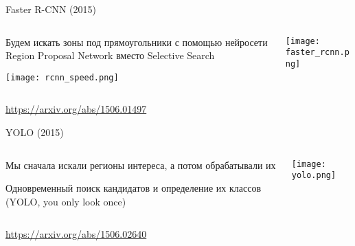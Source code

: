 \documentclass[notes,12pt, aspectratio=169]{beamer}
\newenvironment{wideitemize}{\itemize\addtolength{\itemsep}{10pt}}{\enditemize}
\begin{document}
\begin{frame}{Faster R-CNN (2015)}
	\begin{columns}[T] %
		\begin{column}{.49\textwidth}
			\begin{wideitemize}	
				\item Будем искать зоны под прямоугольники с помощью нейросети Region Proposal Network вместо Selective Search
			\end{wideitemize}
		\vspace{2mm}
		\begin{center}
			\texttt{[image: rcnn\_speed.png]}
		\end{center}
		\end{column}%
		\hfill%
		\begin{column}{.49\textwidth}
			\begin{center}
				\texttt{[image: faster\_rcnn.png]}
			\end{center}
		\end{column}%
	\end{columns}
	\vfill
\footnotesize
{\color{blue} \url{https://arxiv.org/abs/1506.01497}} 
\end{frame}


\begin{frame}{ YOLO (2015)}
	\begin{columns}[T] %
	\begin{column}{.35\textwidth}
		\begin{wideitemize}	
			\item Мы сначала искали регионы интереса, а потом обрабатывали их
			\item Одновременный поиск кандидатов и определение их классов (YOLO, you only look once)
		\end{wideitemize}
	\end{column}%
	\hfill%
	\begin{column}{.65\textwidth}
		\begin{center}
			\texttt{[image: yolo.png]}
		\end{center} 
	\end{column}%
\end{columns}
	
	\vfill
	\footnotesize
	{\color{blue} \url{https://arxiv.org/abs/1506.02640}} 
\end{frame}
\end{document}
